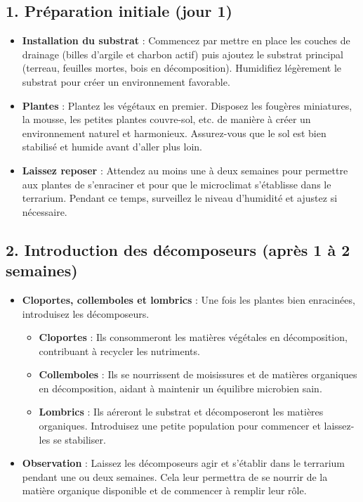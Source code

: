 \subsection*{1. Préparation initiale (jour 1)}
\begin{itemize}
    \item \textbf{Installation du substrat} : Commencez par mettre en place les couches de drainage (billes d'argile et charbon actif) puis ajoutez le substrat principal (terreau, feuilles mortes, bois en décomposition). Humidifiez légèrement le substrat pour créer un environnement favorable.
    \item \textbf{Plantes} : Plantez les végétaux en premier. Disposez les fougères miniatures, la mousse, les petites plantes couvre-sol, etc. de manière à créer un environnement naturel et harmonieux. Assurez-vous que le sol est bien stabilisé et humide avant d'aller plus loin.
    \item \textbf{Laissez reposer} : Attendez au moins une à deux semaines pour permettre aux plantes de s'enraciner et pour que le microclimat s'établisse dans le terrarium. Pendant ce temps, surveillez le niveau d'humidité et ajustez si nécessaire.
\end{itemize}

\subsection*{2. Introduction des décomposeurs (après 1 à 2 semaines)}
\begin{itemize}
    \item \textbf{Cloportes, collemboles et lombrics} : Une fois les plantes bien enracinées, introduisez les décomposeurs.
    \begin{itemize}
        \item \textbf{Cloportes} : Ils consommeront les matières végétales en décomposition, contribuant à recycler les nutriments.
        \item \textbf{Collemboles} : Ils se nourrissent de moisissures et de matières organiques en décomposition, aidant à maintenir un équilibre microbien sain.
        \item \textbf{Lombrics} : Ils aéreront le substrat et décomposeront les matières organiques. Introduisez une petite population pour commencer et laissez-les se stabiliser.
    \end{itemize}
\item \textbf{Observation} : Laissez les décomposeurs agir et s'établir dans le terrarium pendant une ou deux semaines. Cela leur permettra de se nourrir de la matière organique disponible et de commencer à remplir leur rôle.
\end{itemize}


